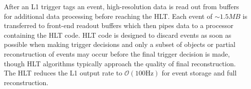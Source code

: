 After an L1 trigger tags an event, high-resolution data is read out from buffers for additional data processing before reaching the HLT. Each event of $\sim1.5MB$ is transferred to front-end readout buffers which then pipes data to a processor containing the HLT code. HLT code is designed to discard events as soon as possible when making trigger decisions and only a subset of objects or partial reconstruction of events may occur before the final trigger decision is made, though HLT algorithms typically approach the quality of final reconstruction. The HLT reduces the L1 output rate to $\mathcal{O}(100\text{Hz})$ for event storage and full reconstruction.
